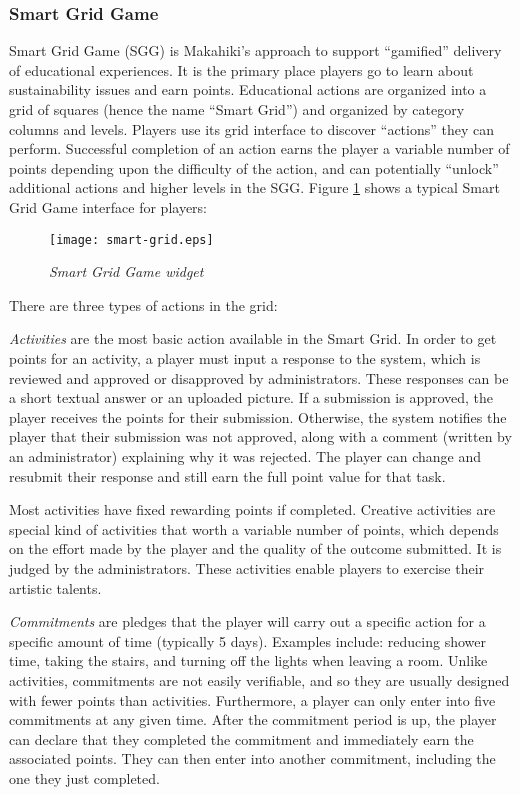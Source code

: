 \clearpage

\subsubsection{Smart Grid Game}

Smart Grid Game (SGG) is Makahiki's approach to support ``gamified'' delivery of educational experiences. It is the primary place players go to learn about sustainability issues and earn points. Educational actions are organized into a grid of squares (hence the name ``Smart Grid'') and organized by category columns and levels. Players use its grid interface to discover ``actions'' they can perform. Successful completion of an action earns the player a variable number of points depending upon the difficulty of the action, and can potentially ``unlock'' additional actions and higher levels in the SGG. Figure \ref{fig:SmartGrid} shows a typical Smart Grid Game interface for players:

\begin{figure}[!ht]
  \center
  \texttt{[image: smart-grid.eps]}
  \caption{\em Smart Grid Game widget}
  \label{fig:SmartGrid}
\end{figure}

There are three types of actions in the grid:

{\em Activities} are the most basic action available in the Smart Grid. In order to get points for an activity, a player must input a response to the system, which is reviewed and approved or disapproved by administrators. These responses can be a short textual answer or an uploaded picture. If a submission is approved, the player receives the points for their submission. Otherwise, the system notifies the player that their submission was not approved, along with a comment (written by an administrator) explaining why it was rejected. The player can change and resubmit their response and still earn the full point value for that task. 

Most activities have fixed rewarding points if completed. Creative activities are special kind of activities that worth a variable number of points, which depends on the effort made by the player and the quality of the outcome submitted. It is judged by the administrators. These activities enable players to exercise their artistic talents. 

{\em Commitments} are pledges that the player will carry out a specific action for a specific amount of time (typically 5 days). Examples include: reducing shower time, taking the stairs, and turning off the lights when leaving a room. Unlike activities, commitments are not easily verifiable, and so they are usually designed with fewer points than activities. Furthermore, a player can only enter into five commitments at any given time. After the commitment period is up, the player can declare that they completed the commitment and immediately earn the associated points. They can then enter into another commitment, including the one they just completed. 

